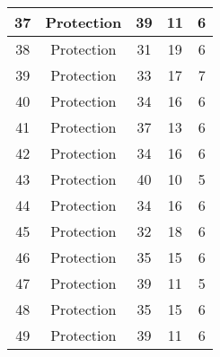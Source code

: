 \documentclass[results.tex]{subfiles}
\begin{document}
\begin{center}
\begin{tabular}{| c || c | c | c | c |}
            \hline
            37                      & Protection                   & 39                     & 11                      & 6                    \\
            \hline
            38                      & Protection                   & 31                     & 19                      & 6                    \\
            \hline
            39                      & Protection                   & 33                     & 17                      & 7                    \\
            \hline
            40                      & Protection                   & 34                     & 16                      & 6                    \\
            \hline
            41                      & Protection                   & 37                     & 13                      & 6                    \\
            \hline
            42                      & Protection                   & 34                     & 16                      & 6                    \\
            \hline
            43                      & Protection                   & 40                     & 10                      & 5                    \\
            \hline
            44                      & Protection                   & 34                     & 16                      & 6                    \\
            \hline
            45                      & Protection                   & 32                     & 18                      & 6                    \\
            \hline
            46                      & Protection                   & 35                     & 15                      & 6                    \\
            \hline
            47                      & Protection                   & 39                     & 11                      & 5                    \\
            \hline
            48                      & Protection                   & 35                     & 15                      & 6                    \\
            \hline
            49                      & Protection                   & 39                     & 11                      & 6                    \\
            \hline
        \end{tabular}
    \end{center}
\end{document}
